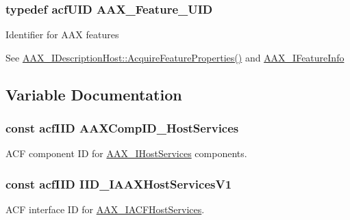 \subsubsection[{A\+A\+X\+\_\+\+Feature\+\_\+\+U\+I\+D}]{\setlength{\rightskip}{0pt plus 5cm}typedef {\bf acf\+U\+I\+D} {\bf A\+A\+X\+\_\+\+Feature\+\_\+\+U\+I\+D}}\label{a00299_a53d6cf8a08224b3e813333e411ce798e}
Identifier for A\+A\+X features

See \hyperlink{a00091_aa0d9e27d0207113f98c217d870bfa5e9}{A\+A\+X\+\_\+\+I\+Description\+Host\+::\+Acquire\+Feature\+Properties()} and \hyperlink{a00100}{A\+A\+X\+\_\+\+I\+Feature\+Info} 

\subsection{Variable Documentation}
\hypertarget{a00299_a0790e4ae407d6560ce1f605f29df324f}{}
\subsubsection[{A\+A\+X\+Comp\+I\+D\+\_\+\+Host\+Services}]{\setlength{\rightskip}{0pt plus 5cm}const {\bf acf\+I\+I\+D} A\+A\+X\+Comp\+I\+D\+\_\+\+Host\+Services}\label{a00299_a0790e4ae407d6560ce1f605f29df324f}


A\+C\+F component I\+D for \hyperlink{a00103}{A\+A\+X\+\_\+\+I\+Host\+Services} components. 

\hypertarget{a00299_aa2268f8c1f129f4f75a27ea3f4a4183b}{}
\subsubsection[{I\+I\+D\+\_\+\+I\+A\+A\+X\+Host\+Services\+V1}]{\setlength{\rightskip}{0pt plus 5cm}const {\bf acf\+I\+I\+D} I\+I\+D\+\_\+\+I\+A\+A\+X\+Host\+Services\+V1}\label{a00299_aa2268f8c1f129f4f75a27ea3f4a4183b}


A\+C\+F interface I\+D for \hyperlink{a00071}{A\+A\+X\+\_\+\+I\+A\+C\+F\+Host\+Services}. 

